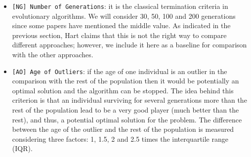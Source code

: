 \documentclass[runningheads,a4paper]{llncs}
\begin{document}
\begin{itemize}
    \item \texttt{[NG] Number of Generations}: it is the classical termination
      criteria in evolutionary algorithms. We will consider 30, 50, 100 and 200 generations since some papers \cite{EvoStar2014:GPBot:anon} have mentioned the middle value. As indicated in the previous section,
      Hart \cite{Hart1996} claims that this is not the right way to
      compare different approaches; however, we include it here as a
      baseline for comparison with the other approaches. %

    \item \texttt{[AO] Age of Outliers}: if the age of one individual is an outlier in the comparison with the rest of the population then it would be potentially an optimal solution and the algorithm can be stopped. %
The idea behind this criterion is that an individual surviving for several generations more than the rest of the population lead to be a very good player (much better than the rest), and thus, a potential optimal solution for the problem. The difference between the age of the outlier and the rest of the population is measured considering three factors: 1, 1.5, 2 and 2.5 times the interquartile range (IQR). %


\end{itemize}
\end{document}
